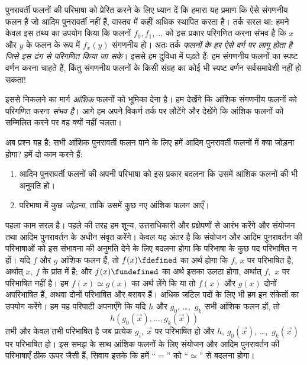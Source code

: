 \documentclass[../../../include/open-logic-section]{subfiles}
\begin{document}


पुनरावर्ती फलनों की परिभाषा को प्रेरित करने के लिए ध्यान दें कि हमारा यह
प्रमाण कि ऐसे संगणनीय फलन हैं जो आदिम पुनरावर्ती नहीं हैं, वास्तव में
कहीं अधिक स्थापित करता है। तर्क सरल था: हमने केवल इस तथ्य का उपयोग किया
कि फलनों $f_0,f_1,\dots$ को इस प्रकार परिगणित करना संभव है कि $x$ और
$y$ के फलन के रूप में $f_x(y)$ संगणनीय हो। अतः तर्क \emph{फलनों के हर
ऐसे वर्ग पर लागू होता है जिसे इस ढंग से परिगणित किया जा सके}। इससे हम
दुविधा में पड़ते हैं: हम संगणनीय फलनों का स्पष्ट वर्णन करना चाहते हैं,
किंतु संगणनीय फलनों के किसी संग्रह का कोई भी स्पष्ट वर्णन सर्वसमावेशी
नहीं हो सकता!

इससे निकलने का मार्ग \emph{आंशिक} फलनों को भूमिका देना है। हम देखेंगे कि
आंशिक संगणनीय फलनों को परिगणित करना \emph{संभव है}। आगे हम अपने विकर्ण तर्क पर
लौटेंगे और देखेंगे कि आंशिक फलनों को सम्मिलित करने पर वह क्यों नहीं चलता।

अब प्रश्न यह है: सभी आंशिक पुनरावर्ती फलन पाने के लिए हमें आदिम
पुनरावर्ती फलनों में क्या जोड़ना होगा? हमें दो काम करने हैं:
\begin{enumerate}
\item आदिम पुनरावर्ती फलनों की अपनी परिभाषा को इस प्रकार बदलना कि उसमें
  आंशिक फलनों की भी अनुमति हो।
\item परिभाषा में कुछ \emph{जोड़ना}, ताकि उसमें कुछ नए आंशिक फलन आएँ।
\end{enumerate}

पहला काम सरल है। पहले की तरह हम शून्य, उत्तराधिकारी और प्रक्षेपणों से
आरंभ करेंगे और संयोजन तथा आदिम पुनरावर्तन के अधीन संवृत करेंगे। केवल यह
अंतर है कि संयोजन और आदिम पुनरावर्तन की परिभाषाओं को इस संभावना की अनुमति
देने के लिए बदलना होगा कि परिभाषा के कुछ पद परिभाषित न हों। यदि $f$ और
$g$ आंशिक फलन हैं, तो $f(x) \fdefined$ का अर्थ होगा कि $f$, $x$ पर
परिभाषित है, अर्थात् $x$, $f$ के प्रांत में है; और $f(x)
\fundefined$ का अर्थ इसका उलटा होगा, अर्थात् $f$,~$x$ पर परिभाषित नहीं
है। हम $f(x) \simeq g(x)$ का अर्थ लेंगे कि या तो $f(x)$ और $g(x)$ दोनों
अपरिभाषित हैं, अथवा दोनों परिभाषित और बराबर हैं। अधिक जटिल पदों के लिए भी
हम इन संकेतों का उपयोग करेंगे। हम यह परिपाटी अपनाएँगे कि यदि $h$ और
$g_0$, \dots,~$g_k$ सभी आंशिक फलन हों, तो
\[
h(g_0(\vec x),\dots,g_k(\vec x))
\]
तभी और केवल तभी परिभाषित है जब प्रत्येक $g_i$, $\vec x$ पर परिभाषित हो
और $h$, $g_0(\vec x)$, \dots,~$g_k(\vec x)$ पर परिभाषित हो। इस समझ के
साथ आंशिक फलनों के लिए संयोजन और आदिम पुनरावर्तन की परिभाषाएँ ठीक ऊपर
जैसी हैं, सिवाय इसके कि हमें ``$=$'' को ``$\simeq$'' से बदलना होगा।
\end{document}
